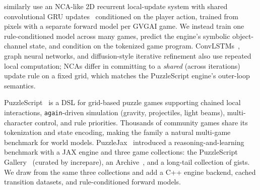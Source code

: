 \cite{bamford2020neural} similarly use an NCA-like 2D recurrent local-update system with shared convolutional GRU updates~\cite{kaiser2016neuralgpu} conditioned on the
player action, trained from pixels with a separate forward model per
GVGAI game. We instead train one rule-conditioned model across many
games, predict the engine's symbolic object-channel state, and
condition on the tokenized game program. ConvLSTMs~\cite{shi2015convlstm},
graph neural networks, and diffusion-style iterative refinement also
use repeated local computation; NCAs differ in committing to a
\emph{shared} (across iterations) update rule on a fixed grid, which
matches the PuzzleScript engine's outer-loop semantics.

PuzzleScript~\cite{lavelle2013puzzlescript} is a DSL for grid-based
puzzle games supporting chained local interactions, \texttt{again}-driven
simulation (gravity, projectiles, light beams), multi-character control,
and rule priorities. Thousands of community games share its tokenization
and state encoding, making the family a natural multi-game benchmark for
world models. PuzzleJax~\cite{earle2025puzzlejax} introduced a
reasoning-and-learning benchmark with a JAX engine and three game
collections: the PuzzleScript Gallery~\cite{puzzlescript_gallery} (curated
by increpare), an Archive~\cite{pedro2019database}, and a long-tail
collection of gists. We draw from the same three collections and add a
C++ engine backend, cached transition datasets, and rule-conditioned
forward models.

